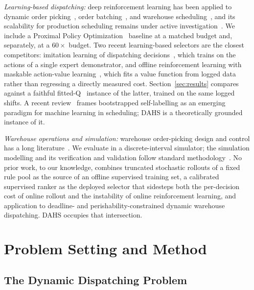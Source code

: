 \documentclass[conference]{IEEEtran}
\begin{document}
\textit{Learning-based dispatching:} deep reinforcement learning has been applied to
dynamic order picking~\cite{mahmoudinazlou2025drl}, order
batching~\cite{cheng2024drlhyperheuristic}, and warehouse
scheduling~\cite{zhang2024lstmppo}, and its scalability for production scheduling
remains under active investigation~\cite{stockermann2025drlscalability,
tassel2023rljssp}. We include a Proximal Policy Optimization~\cite{schulman2017ppo}
baseline at a matched budget and, separately, at a $60\times$ budget. Two recent
learning-based selectors are the closest competitors: imitation learning of
dispatching decisions~\cite{hanjung2025imitation}, which trains on the actions of a
single expert demonstrator, and offline reinforcement learning with maskable
action-value learning~\cite{pluijm2025offlineld}, which fits a value function from
logged data rather than regressing a directly measured cost.
Section~\ref{sec:results} compares against a faithful
fitted-Q~\cite{ernst2005fqi} instance of the latter, trained on the same logged
shifts. A recent review~\cite{sauer2025mlscheduling} frames bootstrapped
self-labelling as an emerging paradigm for machine learning in scheduling; DAHS is a
theoretically grounded instance of it.

\textit{Warehouse operations and simulation:} warehouse order-picking design and
control has a long literature~\cite{dekoster2007orderpicking, roodbergen2006layout,
boysen2019warehousing, boysen2025warehousing}. We evaluate in a discrete-interval
simulator; the simulation modelling and its verification and validation follow
standard methodology~\cite{law2000simulation, sargent2013vandv}. No prior work, to
our knowledge, combines truncated stochastic rollouts of a fixed rule pool as the
source of an offline supervised training set, a calibrated supervised ranker as the
deployed selector that sidesteps both the per-decision cost of online rollout and
the instability of online reinforcement learning, and application to deadline- and
perishability-constrained dynamic warehouse dispatching. DAHS occupies that
intersection.

\section{Problem Setting and Method}
\label{sec:method}

\subsection{The Dynamic Dispatching Problem}
\label{sec:problem}
\end{document}
